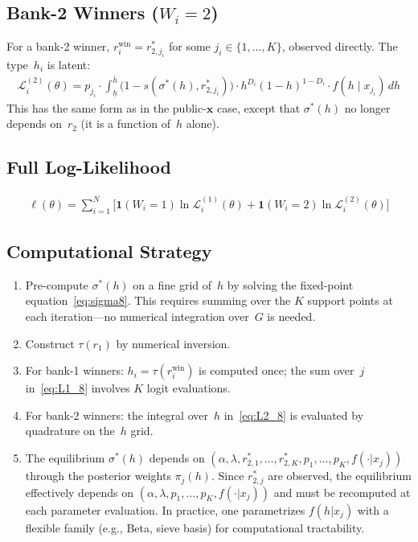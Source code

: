 \documentclass[12pt]{article}
\theoremstyle{plain}
\theoremstyle{plain}
\theoremstyle{definition}
\theoremstyle{remark}
\begin{document}
\subsection{Bank-2 Winners ($W_i = 2$)}

For a bank-2 winner, $r_i^{\text{win}} = r_{2,j_i}^*$ for some $j_i \in \{1, \ldots, K\}$, observed directly.  The type~$h_i$ is latent:
\begin{align}\label{eq:L2_8}
    \boxed{\mathcal{L}_i^{(2)}(\theta) = p_{j_i} \cdot \int_{\underline{h}}^{\bar{h}} \big(1-s(\sigma^*(h), r_{2,j_i}^*)\big) \cdot h^{D_i}(1-h)^{1-D_i} \cdot f(h \mid x_{j_i})\, dh}
\end{align}
This has the same form as in the public-$\mathbf{x}$ case, except that $\sigma^*(h)$ no longer depends on~$r_2$ (it is a function of~$h$ alone).


\subsection{Full Log-Likelihood}

\begin{align}\label{eq:L_full8}
    \ell(\theta) = \sum_{i=1}^N \Big[\mathbf{1}(W_i=1)\ln \mathcal{L}_i^{(1)}(\theta) + \mathbf{1}(W_i=2)\ln \mathcal{L}_i^{(2)}(\theta)\Big]
\end{align}


\subsection{Computational Strategy}

\begin{enumerate}
    \item Pre-compute $\sigma^*(h)$ on a fine grid of~$h$ by solving the fixed-point equation~\eqref{eq:sigma8}.  This requires summing over the $K$ support points at each iteration---no numerical integration over~$G$ is needed.
    \item Construct $\tau(r_1)$ by numerical inversion.
    \item For bank-1 winners: $h_i = \tau(r_i^{\text{win}})$ is computed once; the sum over~$j$ in~\eqref{eq:L1_8} involves $K$ logit evaluations.
    \item For bank-2 winners: the integral over~$h$ in~\eqref{eq:L2_8} is evaluated by quadrature on the~$h$ grid.
    \item The equilibrium $\sigma^*(h)$ depends on $(\alpha, \lambda, r_{2,1}^*, \ldots, r_{2,K}^*, p_1, \ldots, p_K, f(\cdot|x_j))$ through the posterior weights $\pi_j(h)$.  Since $r_{2,j}^*$ are observed, the equilibrium effectively depends on $(\alpha, \lambda, p_1, \ldots, p_K, f(\cdot|x_j))$ and must be recomputed at each parameter evaluation.  In practice, one parametrizes $f(h|x_j)$ with a flexible family (e.g., Beta, sieve basis) for computational tractability.
\end{enumerate}
\end{document}
